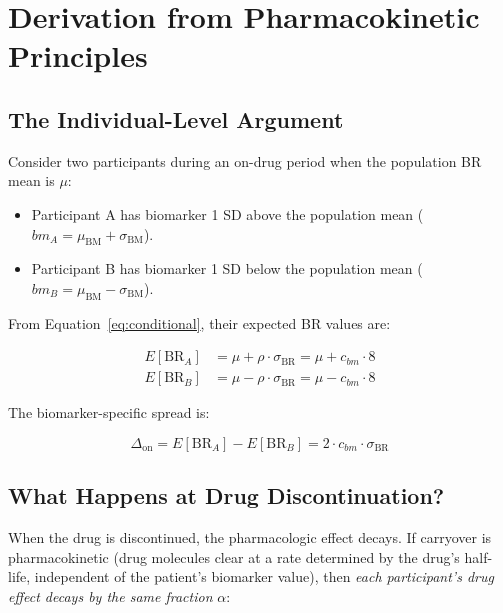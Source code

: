\documentclass[11pt]{article}
\begin{document}
\section{Derivation from Pharmacokinetic Principles}

\subsection{The Individual-Level Argument}

Consider two participants during an on-drug period when the
population BR mean is $\mu$:

\begin{itemize}
\item Participant A has biomarker 1 SD above the population
  mean ($bm_A = \mu_{\text{BM}} + \sigma_{\text{BM}}$).
\item Participant B has biomarker 1 SD below the population
  mean ($bm_B = \mu_{\text{BM}} - \sigma_{\text{BM}}$).
\end{itemize}

From Equation~\ref{eq:conditional}, their expected BR values
are:

\begin{align}
E[\text{BR}_A] &= \mu + \rho \cdot \sigma_{\text{BR}} = \mu + c_{bm} \cdot 8 \label{eq:brA} \\
E[\text{BR}_B] &= \mu - \rho \cdot \sigma_{\text{BR}} = \mu - c_{bm} \cdot 8 \label{eq:brB}
\end{align}

The biomarker-specific spread is:

\begin{equation}
\Delta_{\text{on}} = E[\text{BR}_A] - E[\text{BR}_B]
= 2 \cdot c_{bm} \cdot \sigma_{\text{BR}}
\label{eq:spread_on}
\end{equation}

\subsection{What Happens at Drug Discontinuation?}

When the drug is discontinued, the pharmacologic effect decays.
If carryover is pharmacokinetic (drug molecules clear at a
rate determined by the drug's half-life, independent of the
patient's biomarker value), then \emph{each participant's
drug effect decays by the same fraction} $\alpha$:
\end{document}
